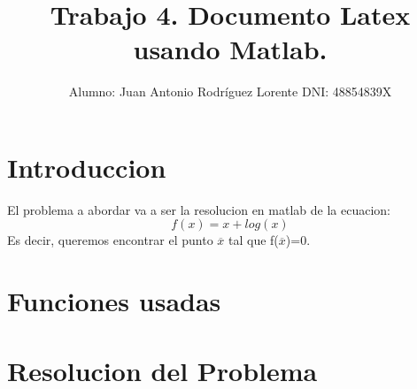 \documentclass[a4paper]{article}
\title{Trabajo 4. Documento Latex usando Matlab.}
\author{Alumno: Juan Antonio Rodríguez Lorente DNI: 48854839X}
\date{}
\begin{document}
\maketitle


\section{Introduccion}
El problema a abordar va a ser la resolucion en matlab de la ecuacion:
\begin{equation}
f(x)=x+log(x)
\end{equation}
Es decir, queremos encontrar el punto $\overline{x}$ tal que f($\overline{x}$)=0.

\section{Funciones usadas}

\section{Resolucion del Problema}
\end{document}
